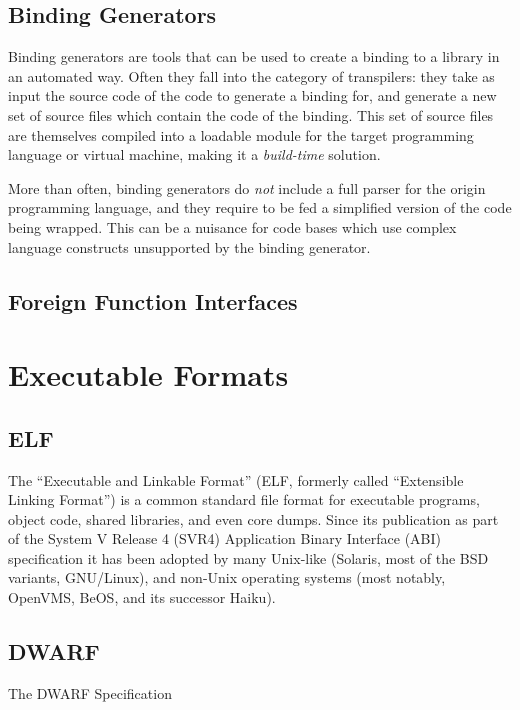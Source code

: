 
\subsection{Binding Generators}

Binding generators are tools that can be used to create a binding to a library
in an automated way. Often they fall into the category of \glspl{transpiler}:
they take as input the source code of the code to generate a binding for,
and generate a new set of source files which contain the code of the binding.
This set of source files are themselves compiled into a loadable module for
the target programming language or virtual machine, making it a
\emph{build-time} solution.

More than often, binding generators do \emph{not} include a full parser for
the origin programming language, and they require to be fed a simplified
version of the code being wrapped. This can be a nuisance for code bases which
use complex language constructs unsupported by the binding generator.

%


\subsection{Foreign Function Interfaces}



%

\section{Executable Formats}

\subsection{ELF}

The “Executable and Linkable Format” (ELF, formerly called “Extensible Linking
Format”) is a common standard file format for executable programs, object
code, shared libraries, and even core dumps. Since its publication as part of
the System V Release 4 (SVR4) Application Binary Interface (ABI) specification
\cite[c.~4]{elfspec-sysv}
it has been adopted by many Unix-like (Solaris, most of the BSD variants,
GNU/Linux), and non-Unix operating systems (most notably, OpenVMS, BeOS, and
its successor Haiku).

\subsection{DWARF}

The DWARF Specification \cite{dwarfspecv4}


